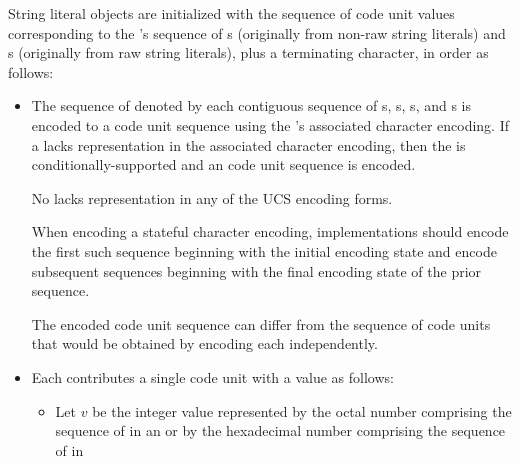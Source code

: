 \documentclass{wg21}
\begin{document}
\pnum
{}%
%
String literal objects are initialized with
the sequence of code unit values
corresponding to the 's sequence of
s (originally from non-raw string literals) and
s (originally from raw string literals),
plus a terminating  character,
in order as follows:
\begin{itemize}
    \item
    The sequence of  denoted by each contiguous sequence of
    s,
    s,
    s, and
    s
    is encoded to a code unit sequence
    using the 's associated character encoding.
    If a  lacks representation in the associated character encoding,
    then the  is conditionally-supported and
    an
    code unit sequence is encoded.
    \begin{note}
        No  lacks representation in any of the UCS encoding forms.
    \end{note}
    When encoding a stateful character encoding,
    implementations should encode the first such sequence
    beginning with the initial encoding state and
    encode subsequent sequences
    beginning with the final encoding state of the prior sequence.
    \begin{note}
        The encoded code unit sequence can differ from
        the sequence of code units that would be obtained by
        encoding each  independently.
    \end{note}
    \item
    Each 
    contributes a single code unit with a value as follows:
    \begin{itemize}
        \item
        Let $v$ be the integer value represented by
        the octal number comprising
        the sequence of  in
        an  or by
        the hexadecimal number comprising
        the sequence of  in

\end{itemize}
\end{itemize}
\end{document}
